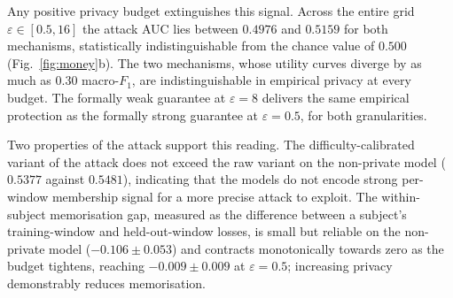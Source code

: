 Any positive privacy budget extinguishes this signal. Across the entire grid
$\varepsilon \in [0.5, 16]$ the attack AUC lies between $0.4976$ and $0.5159$ for
both mechanisms, statistically indistinguishable from the chance value of
$0.500$ (Fig.~\ref{fig:money}b). The two mechanisms, whose utility curves
diverge by as much as $0.30$ macro-$F_1$, are indistinguishable in empirical
privacy at every budget. The formally weak guarantee at $\varepsilon = 8$
delivers the same empirical protection as the formally strong guarantee at
$\varepsilon = 0.5$, for both granularities.

Two properties of the attack support this reading. The difficulty-calibrated
variant of the attack does not exceed the raw variant on the non-private model
($0.5377$ against $0.5481$), indicating that the models do not encode strong
per-window membership signal for a more precise attack to exploit. The
within-subject memorisation gap, measured as the difference between a subject's
training-window and held-out-window losses, is small but reliable on the
non-private model ($-0.106 \pm 0.053$) and contracts monotonically towards zero
as the budget tightens, reaching $-0.009 \pm 0.009$ at $\varepsilon = 0.5$;
increasing privacy demonstrably reduces memorisation.
